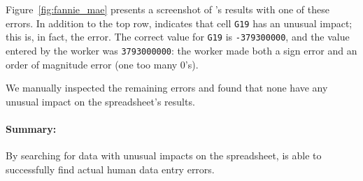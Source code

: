 Figure~\ref{fig:fannie_mae} presents a screenshot of \checkcell{}'s
results with one of these errors. In addition to the top
row, \checkcell{} indicates that cell \texttt{G19} has an unusual
impact; this is, in fact, the error. The correct value
for \texttt{G19} is \texttt{-379300000}, and the value entered by the
worker was \texttt{3793000000}: the worker made both a sign error and
an order of magnitude error (one too many 0's).

We manually inspected the remaining errors and found that none
have any unusual impact on the spreadsheet's results.

\paragraph{Summary:} By searching for data with unusual impacts on the spreadsheet, \checkcell{} is able to successfully find actual human data entry errors.

